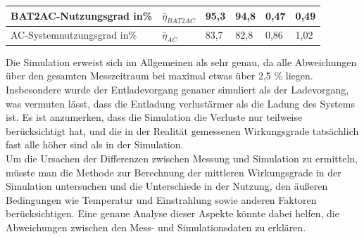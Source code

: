 \begin{table}[ht!]
\begin{tabular}{|l|l|l|l|l|l|}
    BAT2AC-Nutzungsgrad in\%                  &$\bar{\eta}_{BAT2AC}$               & 95,3                                              & 94,8                                  & 0,47                                         & 0,49                                    \\ \hline
   
    AC-Systemnutzungsgrad in\%                &$\bar{\eta}_{AC}$                   & 83,7                                              & 82,8                                  & 0,86                                         & 1,02                                    \\ \hline
 \end{tabular}
\end{table}

Die Simulation erweist sich im Allgemeinen als sehr genau, da alle Abweichungen über den 
gesamten Messzeitraum bei maximal etwas über 2,5 \% liegen. 
Insbesondere wurde der Entladevorgang genauer simuliert als der Ladevorgang, 
was vermuten lässt, dass die Entladung verlustärmer als die Ladung des Systems ist.
Es ist anzumerken, dass die Simulation die Verluste 
nur teilweise berücksichtigt hat, und die in der Realität gemessenen Wirkungsgrade tatsächlich fast alle höher sind als in der Simulation.
\\
Um die Ursachen der Differenzen zwischen Messung und Simulation zu ermitteln, müsste man die Methode zur Berechnung der mittleren 
Wirkungsgrade in der Simulation untersuchen und 
die Unterschiede in der Nutzung, den äußeren Bedingungen wie Temperatur und Einstrahlung sowie anderen Faktoren berücksichtigen. Eine genaue Analyse dieser Aspekte könnte dabei helfen, die Abweichungen zwischen den Mess- und Simulationsdaten zu erklären.